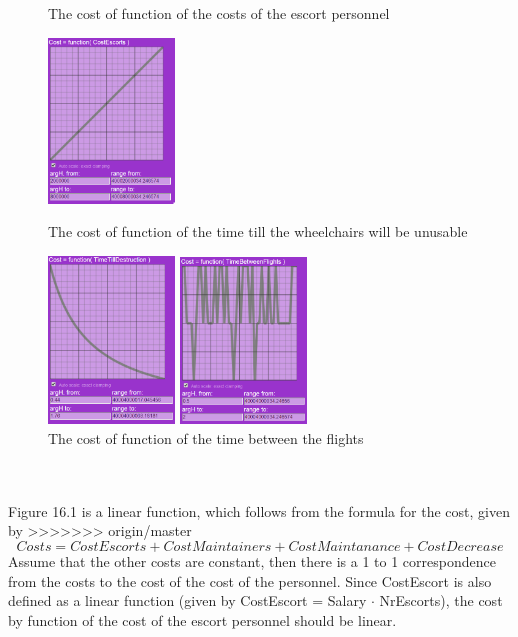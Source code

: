 \documentclass[a4paper, 11pt, notitlepage]{report}
\begin{document}
\begin{figure}[!h]
\caption{The cost of function of the costs of the escort personnel}
\includegraphics[width=0.3\textwidth]{figures/cost(CE)}
\caption{The cost of function of the time till the wheelchairs will be unusable}
\includegraphics[width=0.3\textwidth]{figures/cost(TTD)}
\caption{The cost of function of the time between the flights}
\includegraphics[width=0.3\textwidth]{figures/cost(TBF)}
\end{figure}
\\ \\
Figure 16.1 is a linear function, which follows from the formula for the cost, given by
>>>>>>> origin/master
\begin{equation}
Costs = CostEscorts + CostMaintainers + CostMaintanance + CostDecrease
\end{equation}
Assume that the other costs are constant, then there is a 1 to 1 correspondence from the costs to the cost of the cost of the personnel. Since CostEscort is also defined as a linear function (given by CostEscort = Salary $\cdot$ NrEscorts), the cost by function of the cost of the escort personnel should be linear. \\
\end{document}
